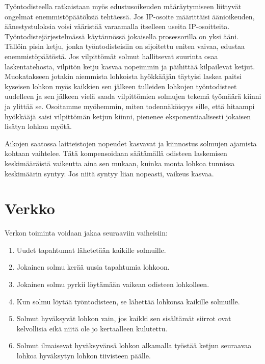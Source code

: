 \documentclass{article}
\begin{document}
Työntodisteella ratkaistaan myös edustusoikeuden määräytymiseen liittyvät ongelmat enemmistöpäätöksiä tehtäessä. Jos IP-osoite määrittäisi äänioikeuden, ää\-nes\-tys\-tu\-lok\-si\-a voisi vääristää varaamalla itselleen useita IP-osoitteita. Työn\-to\-dis\-te\-jär\-jes\-tel\-mäs\-sä  käytännössä jokaisella prosessorilla on yksi ääni. Tällöin pisin ketju, jonka työntodisteisiin on sijoitettu eniten vaivaa, edustaa e\-nem\-mis\-tö\-pää\-tös\-tä. Jos vilpittömät solmut hallitsevat suurinta osaa laskentatehosta, vilpitön ketju kasvaa nopeimmin ja päihittää kilpailevat ketjut. Muokatakseen jotakin aiemmista lohkoista hyökkääjän täytyisi laskea paitsi kyseisen lohkon myös kaikkien sen jälkeen tulleiden lohkojen työntodisteet uudelleen ja sen jälkeen vielä saada vilpittömien solmujen tekemä työmäärä kiinni ja ylittää se. Osoitamme myöhemmin, miten todennäköisyys sille, että hitaampi hyökkääjä saisi vilpittömän ketjun kiinni, pienenee eksponentiaalisesti jokaisen lisätyn lohkon myötä.

Aikojen saatossa laitteistojen nopeudet kasvavat ja kiinnostus solmujen ajamista kohtaan vaihtelee. Tätä kompensoidaan säätämällä odisteen laskemisen keskimääräistä vaikeutta aina sen mukaan, kuinka monta lohkoa tunnissa keskimäärin syntyy. Jos niitä syntyy liian nopeasti, vaikeus kasvaa.

\section{Verkko}

Verkon toiminta voidaan jakaa seuraaviin vaiheisiin:

\begin{enumerate}
    \item Uudet tapahtumat lähetetään kaikille solmuille.
    \item Jokainen solmu kerää uusia tapahtumia lohkoon.
    \item Jokainen solmu pyrkii löytämään vaikean odisteen lohkolleen.
    \item Kun solmu löytää työntodisteen, se lähettää lohkonsa kaikille solmuille.
    \item Solmut hyväksyvät lohkon vain, jos kaikki sen sisältämät siirrot ovat kelvollisia eikä niitä ole jo kertaalleen kulutettu.
    \item Solmut ilmaisevat hyväksyvänsä lohkon alkamalla työstää ketjun seuraavaa lohkoa hyväksytyn lohkon tiivisteen päälle.
\end{enumerate}
\end{document}
